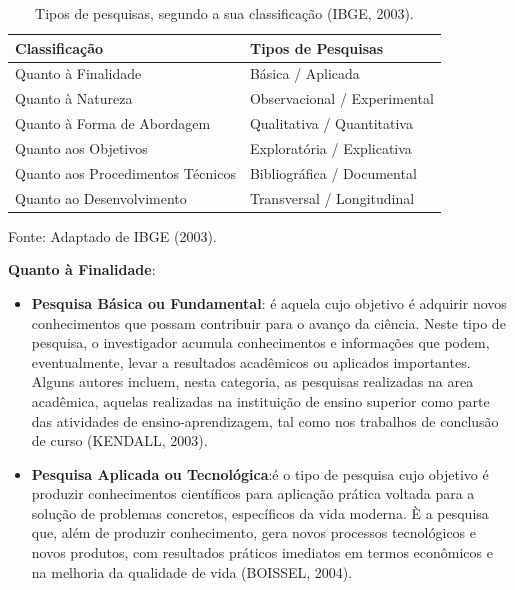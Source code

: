 \begin{table}[htp!]
\centering
\caption{Tipos de pesquisas, segundo a sua classificação (IBGE, 2003).}
\label{tab:tipos_pesquisas}
\renewcommand{\arraystretch}{1.2} %
\begin{tabularx}{\textwidth}{l|X}
\hline
\textbf{Classificação} & \textbf{Tipos de Pesquisas} \\ \hline
Quanto à Finalidade & Básica / Aplicada \\ \hline
Quanto à Natureza & Observacional / Experimental \\ \hline
Quanto à Forma de Abordagem & Qualitativa / Quantitativa \\ \hline
Quanto aos Objetivos & Exploratória / Explicativa \\ \hline
Quanto aos Procedimentos Técnicos & Bibliográfica / Documental \\ \hline
Quanto ao Desenvolvimento & Transversal / Longitudinal \\ \hline
\end{tabularx}
\begin{flushleft}
\footnotesize Fonte: Adaptado de IBGE (2003).
\end{flushleft}
\end{table}

\newpage
\textbf{Quanto à Finalidade}: 

\begin{itemize}
\item \textbf{Pesquisa Básica ou Fundamental}: é aquela cujo objetivo é adquirir novos conhecimentos que possam contribuir para o avanço da ciência. Neste tipo de pesquisa, o investigador acumula conhecimentos e informações que podem, eventualmente, levar a resultados acadêmicos ou aplicados importantes. Alguns autores incluem, nesta categoria, as pesquisas realizadas na area acadêmica, aquelas realizadas na instituição de ensino superior como parte das atividades de ensino-aprendizagem, tal como nos trabalhos de conclusão de curso (KEN\-DALL, 2003). 


\item \textbf{Pesquisa Aplicada ou Tecnológica}:é o tipo de pesquisa cujo objetivo é produzir conhecimentos científicos para aplicação prática voltada para a solução de problemas concretos, específicos da vida moderna. È a pesquisa que, além de produzir conhecimento, gera novos processos tecnológicos e novos produtos, com resultados práticos imediatos em termos econômicos e na melhoria da qualidade de vida (BOISSEL, 2004).
\end{itemize}

